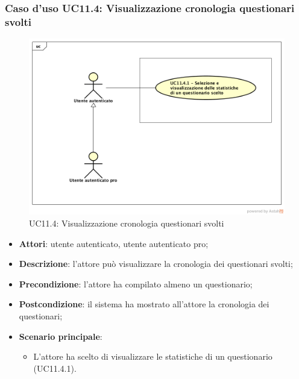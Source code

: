 \subsubsection{Caso d'uso UC11.4: Visualizzazione cronologia questionari svolti}
\label{UC11.4}
\begin{figure}[h]
	\centering
	\includegraphics[scale=0.5]{UML/UC11_4.png}
	\caption{UC11.4: Visualizzazione cronologia questionari svolti}
\end{figure}
\begin{itemize}
\item\textbf{Attori}: utente autenticato, utente autenticato pro;
\item\textbf{Descrizione}: l'attore può visualizzare la cronologia dei questionari svolti;
\item\textbf{Precondizione}: l'attore ha compilato almeno un questionario;
\item\textbf{Postcondizione}: il sistema ha mostrato all'attore la cronologia dei questionari;
\item\textbf{Scenario principale}: 
\begin{itemize}
\item L'attore ha scelto di visualizzare le statistiche di un questionario (UC11.4.1).
\end{itemize}
\end{itemize}

